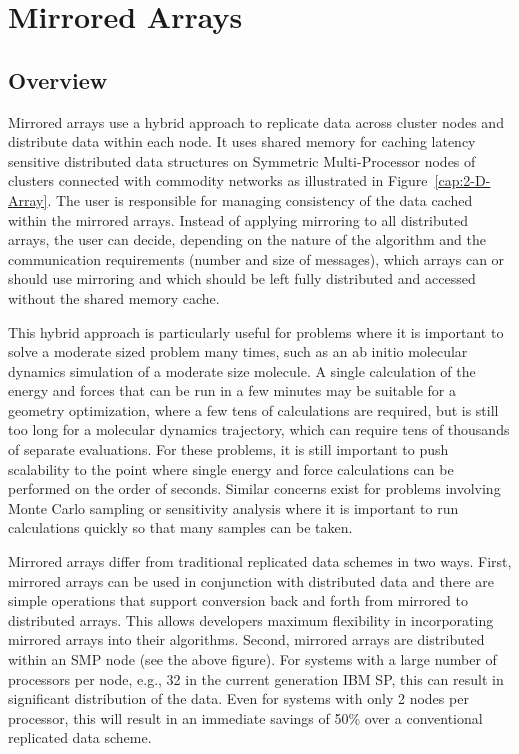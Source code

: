 \chapter{Mirrored Arrays}

\section{Overview}

Mirrored arrays use a hybrid approach to replicate data across cluster
nodes and distribute data within each node. It uses shared memory
for caching latency sensitive distributed data structures on Symmetric
Multi-Processor nodes of clusters connected with commodity networks
as illustrated in Figure~\ref{cap:2-D-Array}. The user is responsible
for managing consistency of the data cached within the mirrored arrays.
Instead of applying mirroring to all distributed arrays, the user
can decide, depending on the nature of the algorithm and the communication
requirements (number and size of messages), which arrays can or should
use mirroring and which should be left fully distributed and accessed
without the shared memory cache. 

This hybrid approach is particularly useful for problems where it
is important to solve a moderate sized problem many times, such as
an ab initio molecular dynamics simulation of a moderate size molecule.
A single calculation of the energy and forces that can be run in a
few minutes may be suitable for a geometry optimization, where a few
tens of calculations are required, but is still too long for a molecular
dynamics trajectory, which can require tens of thousands of separate
evaluations. For these problems, it is still important to push scalability
to the point where single energy and force calculations can be performed
on the order of seconds. Similar concerns exist for problems involving
Monte Carlo sampling or sensitivity analysis where it is important
to run calculations quickly so that many samples can be taken.

Mirrored arrays differ from traditional replicated data schemes in
two ways. First, mirrored arrays can be used in conjunction with distributed
data and there are simple operations that support conversion back
and forth from mirrored to distributed arrays. This allows developers
maximum flexibility in incorporating mirrored arrays into their algorithms.
Second, mirrored arrays are distributed within an SMP node (see the
above figure). For systems with a large number of processors per node,
e.g., 32 in the current generation IBM SP, this can result in significant
distribution of the data. Even for systems with only 2 nodes per processor,
this will result in an immediate savings of 50\% over a conventional
replicated data scheme.

